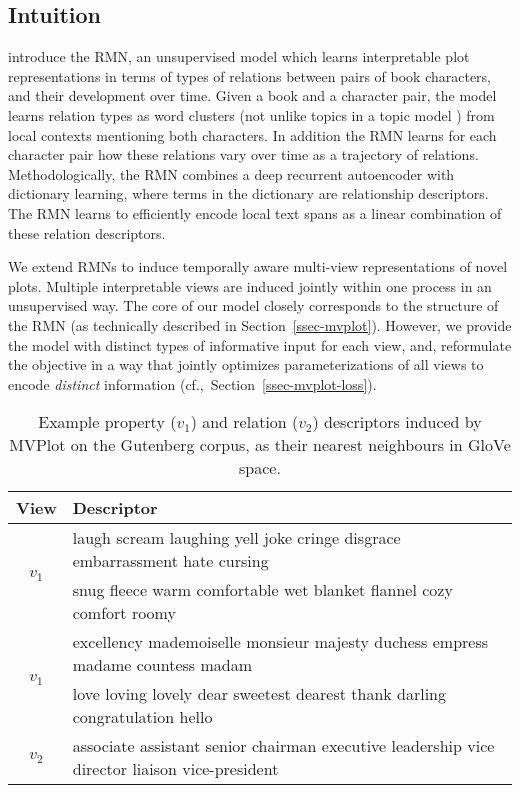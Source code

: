 \documentclass[11pt,letterpaper]{article}
\begin{document}
\subsection{Intuition}
\label{ssec-rmn}
 introduce the RMN, an unsupervised model which learns interpretable plot representations in terms of types of relations between pairs of book characters, and their development over time. Given a book and a character pair, the model learns relation types as word clusters (not unlike topics in a topic model \cite{Blei:2003}) from local contexts mentioning both characters. In addition the RMN learns for each character pair how these relations vary over time as a trajectory of relations. Methodologically, the RMN combines a deep recurrent autoencoder with dictionary learning, where terms in the dictionary are relationship descriptors. The RMN learns to efficiently encode local text spans as a linear combination of these relation descriptors.

We extend RMNs to induce temporally aware multi-view representations of novel plots. Multiple interpretable views are induced jointly within one process in an unsupervised way. The core of our model closely corresponds to the structure of the RMN (as technically described in Section~\ref{ssec-mvplot}). However, we provide the model with distinct types of informative input for each view, and, reformulate the objective in a way that jointly optimizes parameterizations of all views to encode {\it distinct} information (cf.,~Section~\ref{ssec-mvplot-loss}). 
\begin{table}
 \small{\begin{tabular}{cp{6cm}}
  \hline
  {\bf View} & {\bf Descriptor} \\\hline
  \multirow{2}{*}{$v_1$} & laugh scream laughing yell joke cringe disgrace embarrassment hate cursing\\%
  \multirow{2}{*}{$v_1$} & snug fleece warm comfortable wet blanket flannel cozy comfort roomy\\
  \multirow{2}{*}{$v_1$} & excellency mademoiselle monsieur majesty duchess empress madame countess madam\\%
  \multirow{2}{*}{$v_2$} & love loving lovely dear sweetest dearest thank darling congratulation hello\\%
  \multirow{2}{*}{$v_2$} & associate assistant senior chairman executive leadership vice director liaison vice-president\\\hline%
 \end{tabular}}
 \caption{Example property ($v_1$) and relation ($v_2$) descriptors induced by MVPlot on the Gutenberg corpus, as their nearest neighbours in GloVe space.}
 \label{fig-descriptors}
\end{table}
\end{document}
